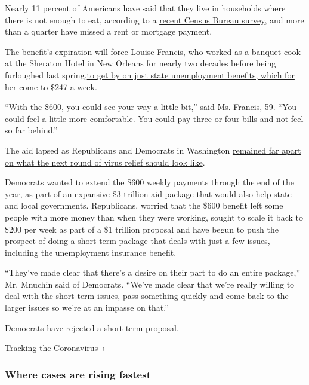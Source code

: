 Nearly 11 percent of Americans have said that they live in households
where there is not enough to eat, according to a
\href{https://www.census.gov/programs-surveys/household-pulse-survey/data.html?utm_campaign=20200727mspuls1ccdtanl\&utm_medium=email\&utm_source=govdelivery}{recent
Census Bureau survey}, and more than a quarter have missed a rent or
mortgage payment.

The benefit's expiration will force Louise Francis, who worked as a
banquet cook at the Sheraton Hotel in New Orleans for nearly two decades
before being furloughed last
spring,\href{https://www.nytimes3xbfgragh.onion/2020/07/30/business/economy/q2-gdp-coronavirus-economy.html}{to
get by on just state unemployment benefits, which for her come to \$247
a week.}

``With the \$600, you could see your way a little bit,'' said Ms.
Francis, 59. ``You could feel a little more comfortable. You could pay
three or four bills and not feel so far behind.''

The aid lapsed as Republicans and Democrats in Washington
\href{https://www.nytimes3xbfgragh.onion/2020/07/28/us/politics/coronavirus-relief-bills-house-senate.html}{remained
far apart on what the next round of virus relief should look like}.

Democrats wanted to extend the \$600 weekly payments through the end of
the year, as part of an expansive \$3 trillion aid package that would
also help state and local governments. Republicans, worried that the
\$600 benefit left some people with more money than when they were
working, sought to scale it back to \$200 per week as part of a \$1
trillion proposal and have begun to push the prospect of doing a
short-term package that deals with just a few issues, including the
unemployment insurance benefit.

``They've made clear that there's a desire on their part to do an entire
package,'' Mr. Mnuchin said of Democrats. ``We've made clear that we're
really willing to deal with the short-term issues, pass something
quickly and come back to the larger issues so we're at an impasse on
that.''

Democrats have rejected a short-term proposal.

\href{https://www.nytimes3xbfgragh.onion/interactive/2020/us/coronavirus-us-cases.html}{Tracking
the Coronavirus~›}

\href{https://www.nytimes3xbfgragh.onion/interactive/2020/us/coronavirus-us-cases.html}{}

\hypertarget{where-cases-are-rising-fastest}{%
\subsubsection{\texorpdfstring{Where cases are \textbf{rising}
fastest}{Where cases are rising fastest}}\label{where-cases-are-rising-fastest}}

